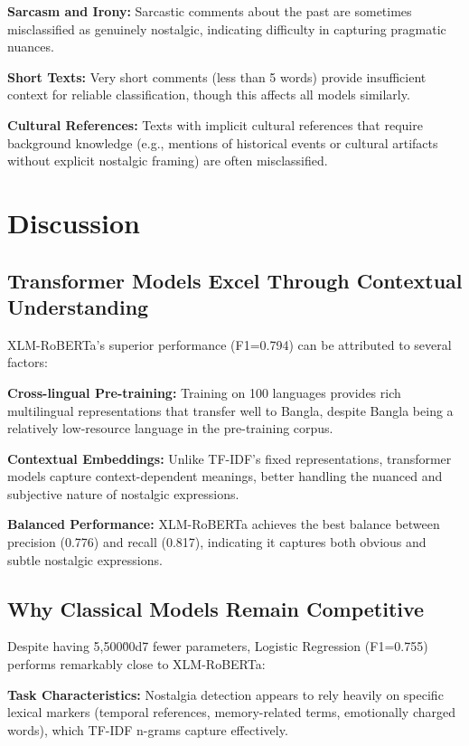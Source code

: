 \documentclass[conference]{IEEEtran}
\begin{document}
\textbf{Sarcasm and Irony:} Sarcastic comments about the past are sometimes misclassified as genuinely nostalgic, indicating difficulty in capturing pragmatic nuances.

\textbf{Short Texts:} Very short comments (less than 5 words) provide insufficient context for reliable classification, though this affects all models similarly.

\textbf{Cultural References:} Texts with implicit cultural references that require background knowledge (e.g., mentions of historical events or cultural artifacts without explicit nostalgic framing) are often misclassified.

\section{Discussion}
\label{sec:discussion}

\subsection{Transformer Models Excel Through Contextual Understanding}

XLM-RoBERTa's superior performance (F1=0.794) can be attributed to several factors:

\textbf{Cross-lingual Pre-training:} Training on 100 languages provides rich multilingual representations that transfer well to Bangla, despite Bangla being a relatively low-resource language in the pre-training corpus.

\textbf{Contextual Embeddings:} Unlike TF-IDF's fixed representations, transformer models capture context-dependent meanings, better handling the nuanced and subjective nature of nostalgic expressions.

\textbf{Balanced Performance:} XLM-RoBERTa achieves the best balance between precision (0.776) and recall (0.817), indicating it captures both obvious and subtle nostalgic expressions.

\subsection{Why Classical Models Remain Competitive}

Despite having 5,500\u00d7 fewer parameters, Logistic Regression (F1=0.755) performs remarkably close to XLM-RoBERTa:

\textbf{Task Characteristics:} Nostalgia detection appears to rely heavily on specific lexical markers (temporal references, memory-related terms, emotionally charged words), which TF-IDF n-grams capture effectively.
\end{document}
